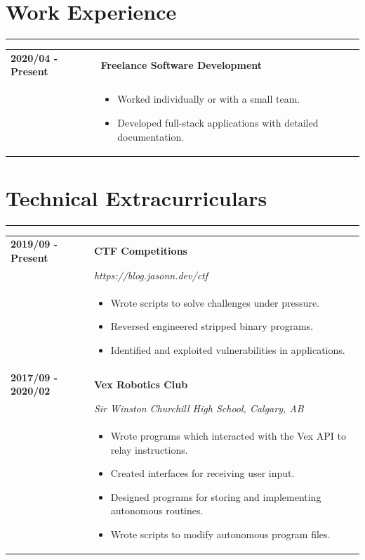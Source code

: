 \documentclass[letterpaper]{article}
\newcommand{\sect}[1]{\section*{#1}
                        {\color{cyan}
                        \rule{\textwidth}{1pt}
                        \vspace{-1ex}}}
\begin{document}
    \sect{Work Experience}

        \begin{tabular}{p{} p{}} 
            \textbf{2020/04 - Present} & \textbf{Freelance Software Development} \\
            & \begin{itemize}
                \item Worked individually or with a small team.
                \item Developed full-stack applications with detailed documentation.
            \end{itemize}
        \end{tabular}

    \sect{Technical Extracurriculars}

        \begin{tabular}{p{} p{}} 
            \textbf{2019/09 - Present} & \textbf{CTF Competitions} \\
            & \emph{https://blog.jasonn.dev/ctf} \\
            & \begin{itemize}
                \item Wrote scripts to solve challenges under pressure.
                \item Reversed engineered stripped binary programs.
                \item Identified and exploited vulnerabilities in applications. 
            \end{itemize}
            \\
            \textbf{2017/09 - 2020/02} & \textbf{Vex Robotics Club} \\
            & \emph{Sir Winston Churchill High School, Calgary, AB} \\
            & \begin{itemize}
                \item Wrote programs which interacted with the Vex API to relay instructions.
                \item Created interfaces for receiving user input.
                \item Designed programs for storing and implementing autonomous routines.
                \item Wrote scripts to modify autonomous program files.
            \end{itemize}
        \end{tabular}
\end{document}
